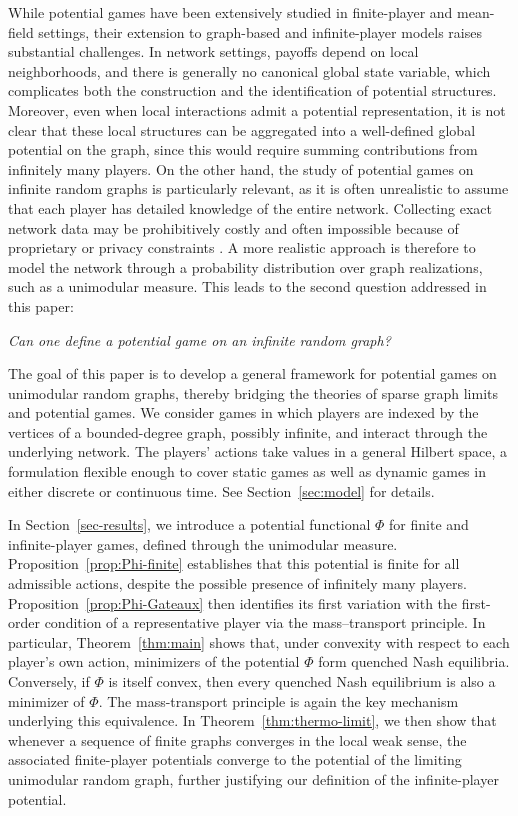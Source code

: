 \documentclass[11pt]{article}
\numberwithin{equation}{section}
\begin{document}
While potential games have been extensively studied in finite-player and mean-field settings, their extension to graph-based and infinite-player models raises substantial challenges. In network settings, payoffs depend on local neighborhoods, and there is generally no canonical global state variable, which complicates both the construction and the identification of potential structures. Moreover, even when local interactions admit a potential representation, it is not clear that these local structures can be aggregated into a well-defined global potential on the graph, since this would require summing contributions from infinitely many players. On the other hand, the study of potential games on infinite random graphs is particularly relevant, as it is often unrealistic to assume that each player has detailed knowledge of the entire network. Collecting exact network data may be prohibitively costly and often impossible because of proprietary or privacy constraints \cite{parise2023graphon}. A more realistic approach is therefore to model the network through a probability distribution over graph realizations, such as a unimodular measure. This leads to the second question addressed in this paper:
\begin{center}
\emph{Can one define a potential game on an infinite random graph?}
\end{center}

The goal of this paper is to develop a general framework for potential games on unimodular random graphs, thereby bridging the theories of sparse graph limits and potential games. We consider games in which players are indexed by the vertices of a bounded-degree graph, possibly infinite, and interact through the underlying network. The players' actions take values in a general Hilbert space, a formulation flexible enough to cover static games as well as dynamic games in either discrete or continuous time. See Section~\ref{sec:model} for details.

In Section~\ref{sec-results}, we introduce a potential functional $\Phi$ for finite and infinite-player games, defined through the unimodular measure. Proposition~\ref{prop:Phi-finite} establishes that this potential is finite for all admissible actions, despite the possible presence of infinitely many players. Proposition~\ref{prop:Phi-Gateaux} then identifies its first variation with the first-order condition of a representative player via the mass–transport principle. In particular, Theorem~\ref{thm:main} shows that, under convexity with respect to each player's own action, minimizers of the potential \(\Phi\) form quenched Nash equilibria. Conversely, if $\Phi$ is itself convex, then every quenched Nash equilibrium is also a minimizer of $\Phi$. The mass-transport principle is again the key mechanism underlying this equivalence. In Theorem~\ref{thm:thermo-limit}, we then show that whenever a sequence of finite graphs converges in the local weak sense, the associated finite-player potentials converge to the potential of the limiting unimodular random graph, further justifying our definition of the infinite-player potential.
\end{document}
